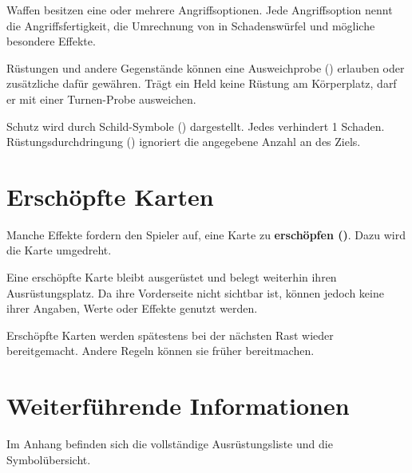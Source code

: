 Waffen besitzen eine oder mehrere Angriffsoptionen. Jede Angriffsoption nennt die Angriffsfertigkeit, die Umrechnung von \star{} in Schadenswürfel und mögliche besondere Effekte.

Rüstungen und andere Gegenstände können eine Ausweichprobe (\evade) erlauben oder zusätzliche \blueDie{} dafür gewähren. Trägt ein Held keine Rüstung am Körperplatz, darf er mit einer Turnen-Probe ausweichen.

Schutz wird durch Schild-Symbole (\armor) dargestellt. Jedes \armor{} verhindert 1 Schaden. Rüstungsdurchdringung (\armorPierce) ignoriert die angegebene Anzahl an \armor{} des Ziels.

\section{Erschöpfte Karten}

Manche Effekte fordern den Spieler auf, eine Karte zu \textbf{erschöpfen (\exhaust)}. Dazu wird die Karte umgedreht.

Eine erschöpfte Karte bleibt ausgerüstet und belegt weiterhin ihren Ausrüstungsplatz. Da ihre Vorderseite nicht sichtbar ist, können jedoch keine ihrer Angaben, Werte oder Effekte genutzt werden.

Erschöpfte Karten werden spätestens bei der nächsten Rast wieder bereitgemacht. Andere Regeln können sie früher bereitmachen.

\section{Weiterführende Informationen}

Im Anhang befinden sich die vollständige Ausrüstungsliste und die Symbolübersicht.